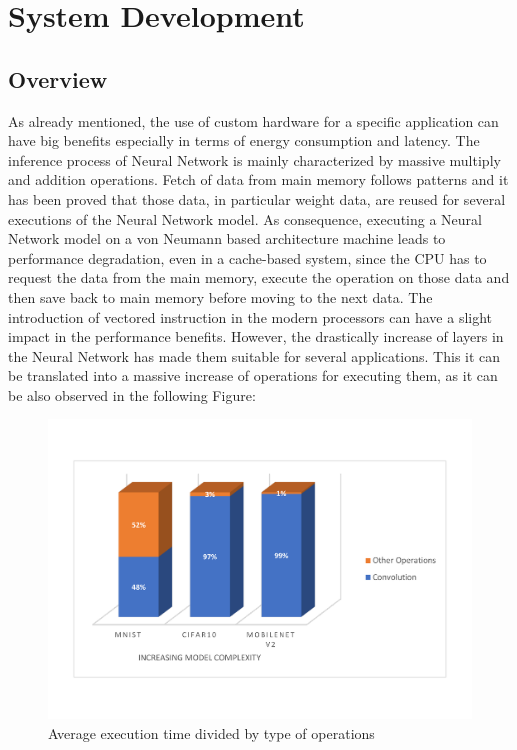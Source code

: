 \chapter{System Development}

\section{Overview}
As already mentioned, the use of custom hardware for a specific application can have big benefits especially in terms of energy consumption and latency.
The inference process of Neural Network is mainly characterized by massive multiply and addition operations. Fetch of data from main memory follows patterns and it has been proved that those data, in particular weight data, are reused for several executions of the Neural Network model.
As consequence, executing a Neural Network model on a von Neumann based architecture machine leads to performance degradation, even in a cache-based system, since the CPU has to request the data from the main memory, execute the operation on those data and then save back to main memory before moving to the next data. The introduction of vectored instruction in the modern processors can have a slight impact in the performance benefits. However, the drastically increase of layers in the Neural Network has made them suitable for several applications. This it can be translated into a massive increase of operations for executing them, as it can be also observed in the following Figure:
\begin{figure}[!htbp]
\centering
\captionsetup{justification=centering}
\includegraphics[scale=0.4]{./figure/exec_time.pdf}
\caption{Average execution time divided by type of operations}
\label{fig:exec}
\end{figure}

